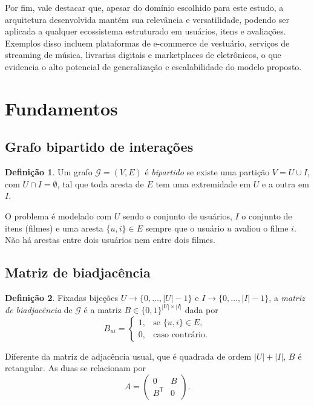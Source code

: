 \documentclass[12pt,a4paper]{article}
\theoremstyle{definition}
\newtheorem{definicao}{Definição}
\begin{document}
Por fim, vale destacar que, apesar do domínio escolhido para este estudo, a arquitetura desenvolvida mantém sua relevância e versatilidade, podendo ser aplicada a qualquer ecossistema estruturado em usuários, itens e avaliações. Exemplos disso incluem plataformas de e-commerce de vestuário, serviços de streaming de música, livrarias digitais e marketplaces de eletrônicos, o que evidencia o alto potencial de generalização e escalabilidade do modelo proposto.


\section{Fundamentos}\label{sec:fundamentos}

\subsection{Grafo bipartido de interações}

\begin{definicao}
Um grafo $\mathcal{G} = (V, E)$ é \emph{bipartido} se existe uma partição
$V = U \cup I$, com $U \cap I = \emptyset$, tal que toda aresta de $E$ tem
uma extremidade em $U$ e a outra em $I$.
\end{definicao}

O problema é modelado com $U$ sendo o conjunto de usuários, $I$ o conjunto de
itens (filmes) e uma aresta $\{u, i\} \in E$ sempre que o usuário $u$ avaliou
o filme $i$. Não há arestas entre dois usuários nem entre dois filmes.

\subsection{Matriz de biadjacência}

\begin{definicao}
Fixadas bijeções $U \to \{0, \dots, |U|-1\}$ e $I \to \{0, \dots, |I|-1\}$, a
\emph{matriz de biadjacência} de $\mathcal{G}$ é a matriz $B \in \{0,1\}^{|U| \times |I|}$
dada por
\[
  B_{ui} =
  \begin{cases}
    1, & \text{se } \{u, i\} \in E,\\
    0, & \text{caso contrário.}
  \end{cases}
\]
\end{definicao}

Diferente da matriz de adjacência usual, que é quadrada de ordem $|U|+|I|$,
$B$ é retangular. As duas se relacionam por
\[
  A = \begin{pmatrix} 0 & B \\ B^{\mathsf T} & 0 \end{pmatrix}.
\]
\end{document}
